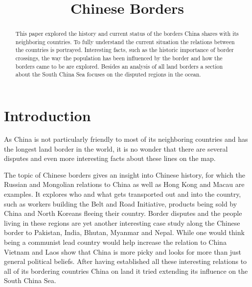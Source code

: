 \documentclass[conference]{IEEEtran}
\begin{document}
	
	\title{Chinese Borders}
	
	\author{
	}
	
	\maketitle
	
	\begin{abstract}
		This paper explored the history and current status of the borders China shares with its neighboring countries. To fully understand the current situation the relations between the countries is portrayed. Interesting facts, such as the historic importance of border crossings, the way the population has been influenced by the border and how the borders came to be are explored. Besides an analysis of all land borders a section about the South China Sea focuses on the disputed regions in the ocean.
	\end{abstract}
	\section{Introduction}
	As China is not particularly friendly to most of its neighboring countries and has the longest land border in the world, it is no wonder that there are several disputes and even more interesting facts about these lines on the map.
	
	The topic of Chinese borders gives an insight into Chinese history, for which the Russian and Mongolian relations to China as well as Hong Kong and Macau are examples. It explores who and what gets transported out and into the country, such as workers building the Belt and Road Initiative, products being sold by China and North Koreans fleeing their country. Border disputes and the people living in these regions are yet another interesting case study along the Chinese border to Pakistan, India, Bhutan, Myanmar and Nepal. While one would think being a communist lead country would help increase the relation to China Vietnam and Laos show that China is more picky and looks for more than just general political beliefs. After having established all these interesting relations to all of its bordering countries China on land it tried extending its influence on the South China Sea. 
	
\end{document}
